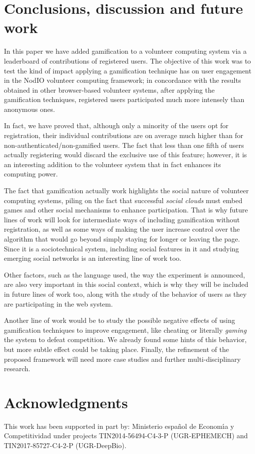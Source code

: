 \documentclass{llncs}
\begin{document}
\section{Conclusions, discussion and future work}

In this paper we have added gamification to a volunteer computing
system via a leaderboard of contributions of registered users. The objective of this work was to test the kind of impact
applying a gamification technique has on user engagement in
the {\sf NodIO}
volunteer computing framework; in concordance with
the results obtained in other
browser-based volunteer systems, after
applying the gamification techniques, registered users participated much more intensely than anonymous ones. 

In fact, we have proved that, although only a minority of the users opt
for registration, their individual contributions are on average much
higher than for non-authenticated/non-gamified users. The fact that less
than one fifth of users actually registering would discard the
exclusive use of this feature; however, it is an interesting addition
to the volunteer system that in fact enhances its computing power.

The fact that gamification actually work highlights the social nature of volunteer computing systems, piling on the fact that successful {\em social clouds} must embed games and other social mechanisms to enhance participation. That is why future lines of work will look for intermediate ways of including
gamification without registration, as well as some ways of making the
user increase control over the algorithm that would go beyond simply
staying for longer or leaving the page. Since it is a sociotechnical
system, including social features in it and studying emerging social
networks is an interesting line of work too.

Other factors, such as the language used, the way the experiment is
announced, are also very important in this social context, which is
why they will be included in future lines of work too, along with the
study of the behavior of users as they are participating
in the web system.

Another line of work would be to study the possible negative effects of using
gamification techniques to improve engagement, like cheating or
literally {\em gaming} the system to defeat competition. We already
found some hints of this behavior, but more subtle effect could be taking place.
Finally, the refinement of the proposed framework will need
more case studies and further multi-disciplinary research.


\section*{Acknowledgments}

This work has been supported in part by: Ministerio espa\~{n}ol de
 Econom\'{\i}a y Competitividad under projects TIN2014-56494-C4-3-P
 (UGR-EPHEMECH) and TIN2017-85727-C4-2-P (UGR-DeepBio).





\end{document}
